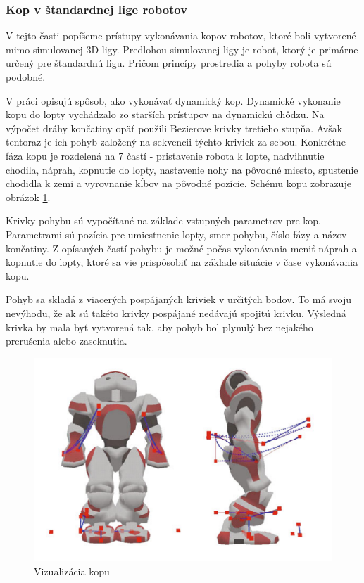 \subsubsection{Kop v štandardnej lige robotov}\label{sec_bremen}
V tejto časti popíšeme prístupy vykonávania kopov robotov, ktoré boli vytvorené mimo simulovanej 3D ligy. Predlohou simulovanej ligy je robot, ktorý je primárne určený pre štandardnú ligu. Pričom princípy prostredia a pohyby robota sú podobné. 

V práci \cite{bremen} opisujú spôsob, ako vykonávať dynamický kop. Dynamické vykonanie kopu do lopty vychádzalo zo starších prístupov na dynamickú chôdzu. Na výpočet dráhy končatiny opäť použili Bezierove krivky tretieho stupňa. Avšak tentoraz je ich pohyb založený na sekvencii týchto kriviek za sebou. Konkrétne fáza kopu je rozdelená na 7 častí - pristavenie robota k lopte, nadvihnutie chodila, náprah, kopnutie do lopty, nastavenie nohy na pôvodné miesto, spustenie chodidla k zemi a vyrovnanie kĺbov na pôvodné pozície. Schému kopu zobrazuje obrázok \ref{pic_kick_arch_bremen}. 

Krivky pohybu sú vypočítané na základe vstupných parametrov pre kop. Parametrami sú pozícia pre umiestnenie lopty, smer pohybu, číslo fázy a názov končatiny. Z opísaných častí pohybu je možné počas vykonávania meniť náprah a kopnutie do lopty, ktoré sa vie prispôsobiť na základe situácie v čase vykonávania kopu.

Pohyb sa skladá z viacerých pospájaných kriviek v určitých bodov. To má svoju nevýhodu, že ak sú takéto krivky pospájané nedávajú spojitú krivku. Výsledná krivka by mala byť vytvorená tak, aby pohyb bol plynulý bez nejakého prerušenia alebo zaseknutia. 

\begin{figure}[H]
	\center
	\includegraphics[scale=1]{./data/kick_arch_bremen}
	\caption{Vizualizácia kopu \cite{bremen}}
	\label{pic_kick_arch_bremen}
\end{figure}

